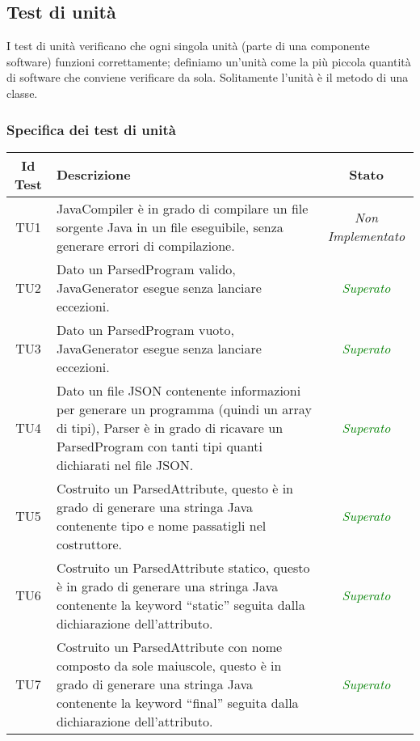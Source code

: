 \subsection{Test di unità}
I test di unità verificano che ogni singola unità (parte di una componente software) funzioni correttamente; definiamo un'unità come la più piccola quantità di software che conviene verificare da sola. Solitamente l'unità è il metodo di una classe.

\subsubsection{Specifica dei test di unità} \label{sec:spec_tu}
\normalsize
\begin{longtable}{|c|>{}m{8cm}|c|}
\hline 
\textbf{Id Test} & \textbf{Descrizione} & \textbf{Stato}\\
\hline
\endhead
\hypertarget{TU1}{TU1} & JavaCompiler è in grado di compilare un file sorgente Java in un file eseguibile, senza generare errori di compilazione. & \textit{Non Implementato}\\ \hline
\hypertarget{TU2}{TU2} & Dato un ParsedProgram valido, JavaGenerator esegue senza lanciare eccezioni. & \textcolor{Green}{\textit{Superato}}\\ \hline
\hypertarget{TU3}{TU3} & Dato un ParsedProgram vuoto, JavaGenerator esegue senza lanciare eccezioni. & \textcolor{Green}{\textit{Superato}}\\ \hline
\hypertarget{TU4}{TU4} & Dato un file JSON contenente informazioni per generare un programma (quindi un array di tipi), Parser è in grado di ricavare un ParsedProgram con tanti tipi quanti dichiarati nel file JSON. & \textcolor{Green}{\textit{Superato}}\\ \hline
\hypertarget{TU5}{TU5} & Costruito un ParsedAttribute, questo è in grado di generare una stringa Java contenente tipo e nome passatigli nel costruttore. & \textcolor{Green}{\textit{Superato}}\\ \hline
\hypertarget{TU6}{TU6} & Costruito un ParsedAttribute statico, questo è in grado di generare una stringa Java contenente la keyword ``static'' seguita dalla dichiarazione dell'attributo. & \textcolor{Green}{\textit{Superato}}\\ \hline
\hypertarget{TU7}{TU7} & Costruito un ParsedAttribute con nome composto da sole maiuscole, questo è in grado di generare una stringa Java contenente la keyword ``final'' seguita dalla dichiarazione dell'attributo. & \textcolor{Green}{\textit{Superato}}\\ \hline

\end{longtable}
